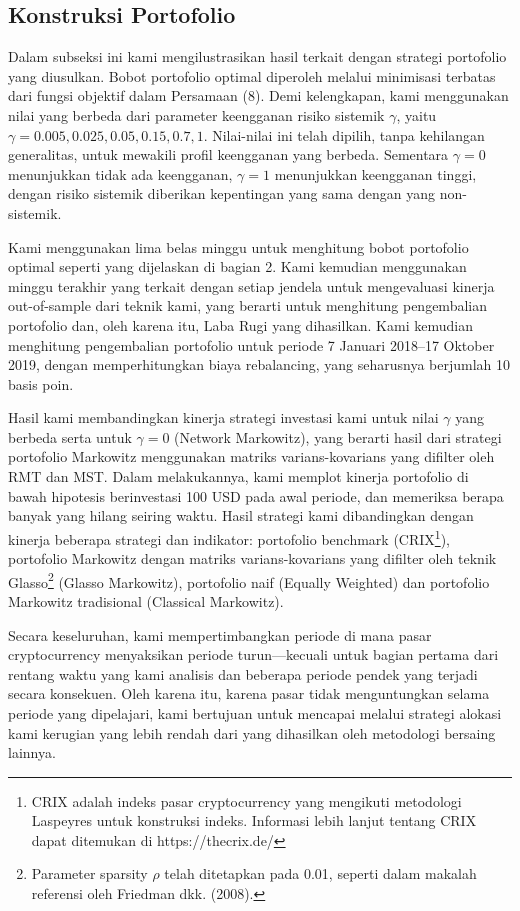 \documentclass[12pt,a4paper]{article}
\begin{document}
\subsection{Konstruksi Portofolio}

Dalam subseksi ini kami mengilustrasikan hasil terkait dengan strategi portofolio yang diusulkan. Bobot portofolio optimal diperoleh melalui minimisasi terbatas dari fungsi objektif dalam Persamaan (8). Demi kelengkapan, kami menggunakan nilai yang berbeda dari parameter keengganan risiko sistemik $\gamma$, yaitu $\gamma = 0.005, 0.025, 0.05, 0.15, 0.7, 1$. Nilai-nilai ini telah dipilih, tanpa kehilangan generalitas, untuk mewakili profil keengganan yang berbeda. Sementara $\gamma = 0$ menunjukkan tidak ada keengganan, $\gamma = 1$ menunjukkan keengganan tinggi, dengan risiko sistemik diberikan kepentingan yang sama dengan yang non-sistemik.

Kami menggunakan lima belas minggu untuk menghitung bobot portofolio optimal seperti yang dijelaskan di bagian 2. Kami kemudian menggunakan minggu terakhir yang terkait dengan setiap jendela untuk mengevaluasi kinerja out-of-sample dari teknik kami, yang berarti untuk menghitung pengembalian portofolio dan, oleh karena itu, Laba Rugi yang dihasilkan. Kami kemudian menghitung pengembalian portofolio untuk periode 7 Januari 2018--17 Oktober 2019, dengan memperhitungkan biaya rebalancing, yang seharusnya berjumlah 10 basis poin.

Hasil kami membandingkan kinerja strategi investasi kami untuk nilai $\gamma$ yang berbeda serta untuk $\gamma = 0$ (Network Markowitz), yang berarti hasil dari strategi portofolio Markowitz menggunakan matriks varians-kovarians yang difilter oleh RMT dan MST. Dalam melakukannya, kami memplot kinerja portofolio di bawah hipotesis berinvestasi 100 USD pada awal periode, dan memeriksa berapa banyak yang hilang seiring waktu. Hasil strategi kami dibandingkan dengan kinerja beberapa strategi dan indikator: portofolio benchmark (CRIX\footnote{CRIX adalah indeks pasar cryptocurrency yang mengikuti metodologi Laspeyres untuk konstruksi indeks. Informasi lebih lanjut tentang CRIX dapat ditemukan di https://thecrix.de/}), portofolio Markowitz dengan matriks varians-kovarians yang difilter oleh teknik Glasso\footnote{Parameter sparsity $\rho$ telah ditetapkan pada 0.01, seperti dalam makalah referensi oleh Friedman dkk. (2008).} (Glasso Markowitz), portofolio naif (Equally Weighted) dan portofolio Markowitz tradisional (Classical Markowitz).

Secara keseluruhan, kami mempertimbangkan periode di mana pasar cryptocurrency menyaksikan periode turun—kecuali untuk bagian pertama dari rentang waktu yang kami analisis dan beberapa periode pendek yang terjadi secara konsekuen. Oleh karena itu, karena pasar tidak menguntungkan selama periode yang dipelajari, kami bertujuan untuk mencapai melalui strategi alokasi kami kerugian yang lebih rendah dari yang dihasilkan oleh metodologi bersaing lainnya.
\end{document}
